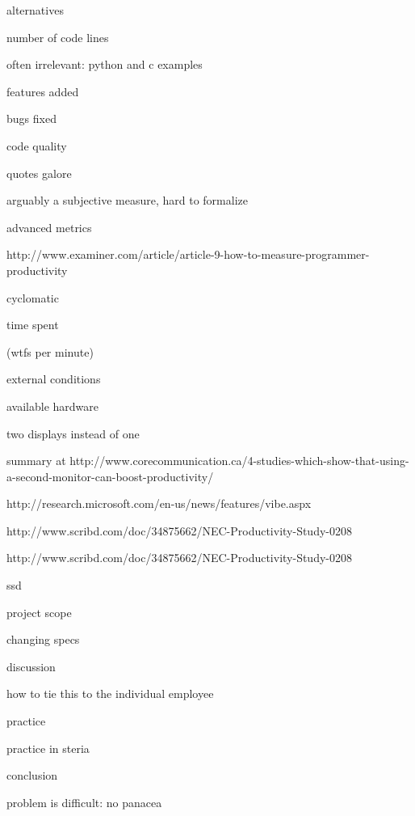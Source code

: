 \documentclass[letterpaper, 12pt]{report}
\begin{document}
	alternatives

		number of code lines

			often irrelevant: python and c examples

		features added

		bugs fixed

		code quality

			quotes galore

			arguably a subjective measure, hard to formalize

		advanced metrics

			http://www.examiner.com/article/article-9-how-to-measure-programmer-productivity

			cyclomatic




		time spent

		(wtfs per minute)

	external conditions

		available hardware

		two displays instead of one

			summary at http://www.corecommunication.ca/4-studies-which-show-that-using-a-second-monitor-can-boost-productivity/

			http://research.microsoft.com/en-us/news/features/vibe.aspx


			http://www.scribd.com/doc/34875662/NEC-Productivity-Study-0208


			http://www.scribd.com/doc/34875662/NEC-Productivity-Study-0208

		ssd

		project scope

			changing specs

	discussion

		how to tie this to the individual employee

	practice

		practice in steria

conclusion

	problem is difficult: no panacea
\end{document}

